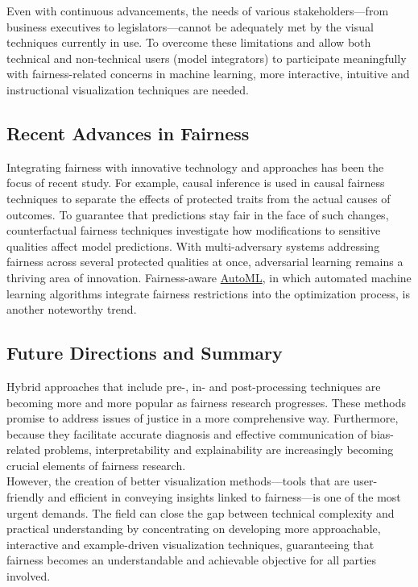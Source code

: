 \documentclass[runningheads]{llncs}
\begin{document}
Even with continuous advancements, the needs of various stakeholders—from business executives to legislators—cannot be adequately met by the visual techniques currently in use. To overcome these limitations and allow both technical and non-technical users (model integrators) to participate meaningfully with fairness-related concerns in machine learning, more interactive, intuitive and instructional visualization techniques are needed.

\subsection{Recent Advances in Fairness}
Integrating fairness with innovative technology and approaches has been the focus of recent study. For example, causal inference is used in causal fairness techniques to separate the effects of protected traits from the actual causes of outcomes. To guarantee that predictions stay fair in the face of such changes, counterfactual fairness techniques investigate how modifications to sensitive qualities affect model predictions. With multi-adversary systems addressing fairness across several protected qualities at once, adversarial learning remains a thriving area of innovation. Fairness-aware \href{https://www.automl.org/automl/}{AutoML}, in which automated machine learning algorithms integrate fairness restrictions into the optimization process, is another noteworthy trend.

\subsection{Future Directions and Summary}
Hybrid approaches that include pre-, in- and post-processing techniques are becoming more and more popular as fairness research progresses. These methods promise to address issues of justice in a more comprehensive way. Furthermore, because they facilitate accurate diagnosis and effective communication of bias-related problems, interpretability and explainability are increasingly becoming crucial elements of fairness research.\cite{google2024bias}\\

However, the creation of better visualization methods—tools that are user-friendly and efficient in conveying insights linked to fairness—is one of the most urgent demands. The field can close the gap between technical complexity and practical understanding by concentrating on developing more approachable, interactive and example-driven visualization techniques, guaranteeing that fairness becomes an understandable and achievable objective for all parties involved.
\end{document}
